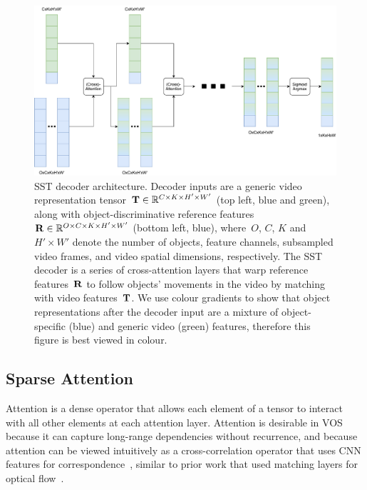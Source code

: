 \begin{figure}
\centering
\includegraphics[scale=0.4]{Figures/aina_decoder}
\caption{SST decoder architecture.
         Decoder inputs are a generic video representation
         tensor~$\mathbf{T}{}\in\mathbb{R}{}^{C\times K \times H'\times W'}$ (top
         left, blue and green), along with object-discriminative reference
         features~$\mathbf{R}{}\in\mathbb{R}{}^{O\times C\times K \times H'\times W'}$
         (bottom left, blue), where~$O$, $C$, $K$ and~$H'\times W'$ denote the
         number of objects, feature channels, subsampled video frames, and
         video spatial dimensions, respectively.
         The SST decoder is a series of cross-attention layers that warp
         reference features~$\mathbf{R}{}$ to follow objects' movements in the
         video by matching with video features~$\mathbf{T}{}$.
         We use colour gradients to show that object representations after the
         decoder input are a mixture of object-specific (blue) and generic
         video (green) features, therefore this figure is best viewed in
         colour.}
\label{fig:ainadecoder}
\end{figure}


\subsection{Sparse Attention}
\label{sec:sparse-attn}

Attention is a dense operator that allows each element of a tensor to interact
with all other elements at each attention layer.
Attention is desirable in VOS because it can capture long-range dependencies
without recurrence, and because attention can be viewed intuitively as a
cross-correlation operator that uses CNN features for
correspondence~\cite{long2014correspondence}, similar to prior work that used
matching layers for optical flow~\cite{dosovitskiy2015flownet}.

